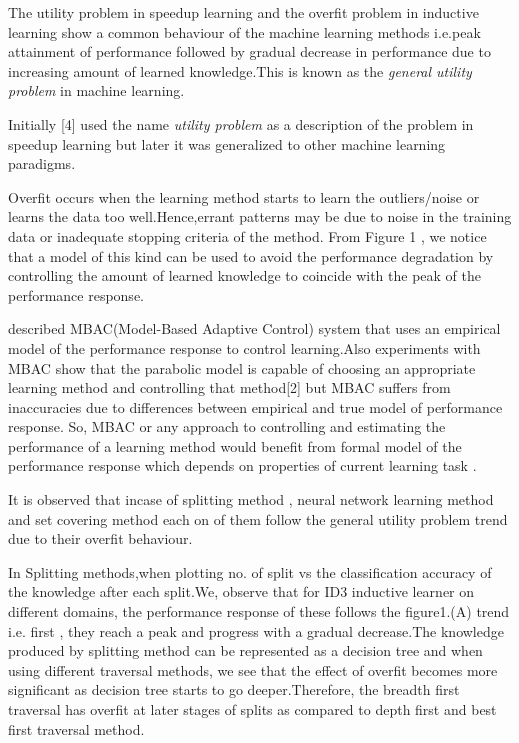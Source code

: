 \documentclass[extendedabs]{bmvc2k}
\begin{document}
\noindent
The utility problem in speedup learning and the overfit problem in inductive learning show a common behaviour of the machine learning methods i.e.peak attainment of performance followed by gradual decrease in performance due to increasing amount of learned knowledge.This is known as the \textit{general utility problem} in machine learning.\par 
Initially [4] used the name  \textit{utility problem} as a description of the problem in speedup learning but later it was generalized to other machine learning paradigms. \par
Overfit occurs when the learning method  starts to learn the outliers/noise or learns the data too well.Hence,errant patterns may be due to noise in the training data or inadequate stopping criteria of the method.
From Figure 1 , we notice that a model of this kind can be used to avoid the performance degradation by controlling the amount of learned knowledge to coincide with the peak of the performance response.\par
[2] described MBAC(Model-Based Adaptive Control) system that uses an empirical model of the performance response to control learning.Also experiments with MBAC show that the parabolic model is capable of choosing an appropriate learning method and controlling that method[2] but MBAC suffers from inaccuracies due to differences between empirical and true model of performance response. So,  MBAC or any approach to controlling and estimating the performance of a learning method would benefit from formal model of the performance response which depends on properties of current learning task .\par It is observed that incase of  splitting method , neural network learning method and set covering method each on of them follow the general utility problem trend due to their overfit behaviour.\par 
In Splitting methods,when plotting no. of split vs the classification accuracy of the knowledge after each split.We, observe that for ID3 inductive learner on different domains, the performance response of these follows the figure1.(A) trend i.e. first , they reach a peak and progress with a gradual decrease.The knowledge produced by splitting method can be represented as a decision tree and when using different traversal methods, we see that the effect of overfit becomes more significant as decision tree starts to go deeper.Therefore, the breadth first traversal has overfit at later stages of splits as compared to depth first and best first traversal method.
\end{document}
